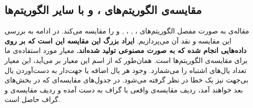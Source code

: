 \documentclass[a4paper,12pt]{article}
\begin{document}
\subsection{مقایسه‌ی الگوریتم‌های‌
،
 و 
با سایر الگوریتم‌ها
}
مقاله‌ی 
\cite{continous}
به صورت مفصل الگوریتم‌های ،
, 
، 
,
و
را مقایسه می‌کند. در ادامه به بررسی این مقایسه و نقد آن می‌پردازیم. 
\textbf{ایراد بزرگ این مقایسه این است که بر روی داده‌هایی انجام شده که به صورت مصنوعی تولید شده‌اند.}
معیار مورد استفاده‌ی ما برای مقایسه‌ی الگوریتم‌ها  \textbf{} است.
	همان‌طور که از اسم این معیار بر می‌آید، این معیار تعداد یال‌های اشتباه را می‌شمارد. وجود هر یال اضافه یا جهت‌دار به دست‌آوردن یال بی‌جهت نیز یک خطا در نظر گرفته می‌شود. در جدول‌های مقایسه‌ای که در بخش‌های بعد خواهند آمد، ردیف 
	مقایسه‌ی 
	واقعی با گراف به دست آمده  و ردیف
	مقایسه‌ی
	و گراف حاصل است.  
	
\end{document}
